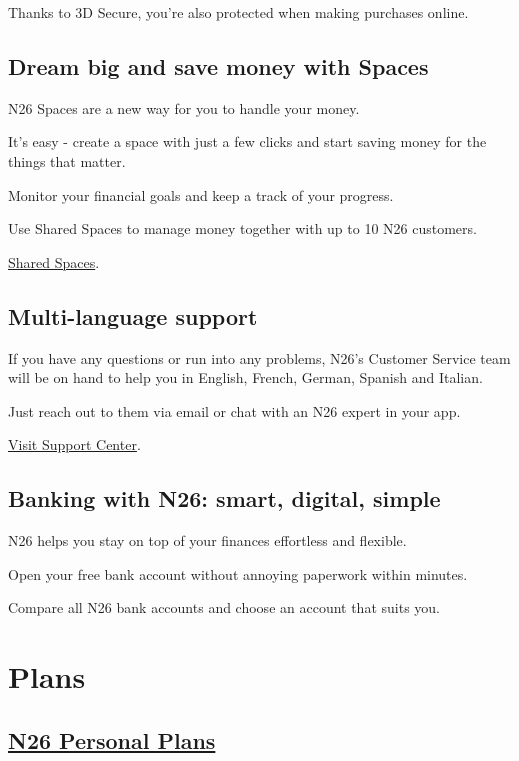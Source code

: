 \documentclass[onsided]{book}
\numberwithin{equation}{section}
\begin{document}
Thanks to 3D Secure, you're also protected when making purchases online.

\section{Dream big and save money with Spaces}
N26 Spaces are a new way for you to handle your money.

It's easy - create a space with just a few clicks and start saving money for the things that matter.

Monitor your financial goals and keep a track of your progress.

Use Shared Spaces to manage money together with up to 10 N26 customers.

\href{https://n26.com/en-de/shared-spaces-bank-account}{Shared Spaces}.

\section{Multi-language support}
If you have any questions or run into any problems, N26's Customer Service team will be on hand to help you in English, French, German, Spanish and Italian.

Just reach out to them via email or chat with an N26 expert in your app.

\href{https://support.n26.com/?_ga=2.152159737.1189510936.1611884241-1079622474.1611780638}{Visit Support Center}.

\section{Banking with N26: smart, digital, simple}
N26 helps you stay on top of your finances effortless and flexible.

Open your free bank account without annoying paperwork within minutes.

Compare all N26 bank accounts and choose an account that suits you.


\chapter{Plans}

\section{\href{https://n26.com/en-de/plans}{N26 Personal Plans}}
\end{document}
